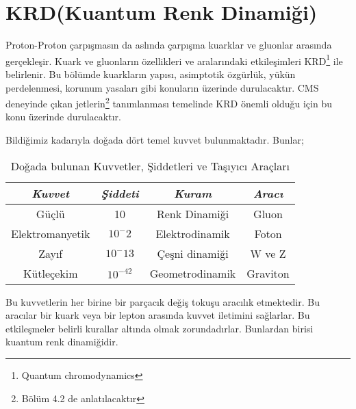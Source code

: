 \chapter{KRD(Kuantum Renk Dinamiği)}
Proton-Proton çarpışmasın da aslında çarpışma kuarklar ve gluonlar arasında gerçekleşir. Kuark ve gluonların özellikleri ve aralarındaki etkileşimleri KRD\footnote{Quantum chromodynamics } ile belirlenir. Bu bölümde kuarkların yapısı, asimptotik özgürlük, yükün perdelenmesi, korunum yasaları gibi konuların üzerinde durulacaktır. CMS deneyinde çıkan jetlerin\footnote{Bölüm 4.2 de anlatılacaktır } tanımlanması temelinde KRD önemli olduğu için bu konu üzerinde durulacaktır.
\par Bildiğimiz kadarıyla doğada dört temel kuvvet bulunmaktadır. Bunlar;
\begin{table}[!htbp]
\centering
\begin{tabular}{|c|c|c|c|}
\hline 
\textit{Kuvvet} & \textit{Şiddeti} & \textit{Kuram} & \textit{Aracı} \\ 
\hline 
Güçlü & 10 & Renk Dinamiği & Gluon \\ 
\hline 
Elektromanyetik & $10^-2$ & Elektrodinamik & Foton \\ 
\hline 
Zayıf & $10^-{13}$ & Çeşni dinamiği & W ve Z \\ 
\hline 
Kütleçekim & $10^{-42}$ & Geometrodinamik & Graviton \\ 
\hline 
\end{tabular} 
\caption{Doğada bulunan Kuvvetler, Şiddetleri ve Taşıyıcı Araçları}
\end{table}
\par Bu kuvvetlerin her birine bir parçacık değiş tokuşu aracılık etmektedir. Bu aracılar bir kuark veya bir lepton arasında kuvvet iletimini sağlarlar. Bu etkileşmeler belirli kurallar altında olmak zorundadırlar. Bunlardan birisi kuantum renk dinamiğidir.


